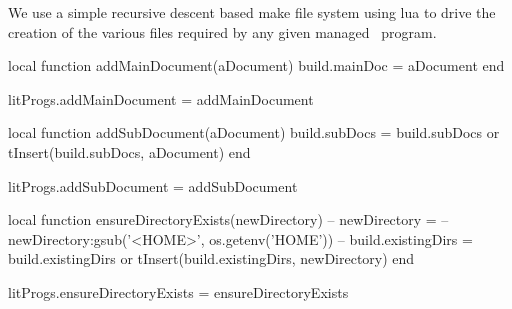 
\startchapter[title=Lua Make System Files]

We use a simple recursive descent based make file system using lua to 
drive the creation of the various files required by any given 
 managed \ConTeXt\ program. 

\startMkIVCode
\def\addMainDocument#1{
  \directlua{
    thirddata.literateProgs.addMainDocument('#1')
  }
}

\def\addSubDocument#1{
  \directlua{
    thirddata.literateProgs.addSubDocument('#1')
  }
}

\def\ensureDirectoryExists#1{
  \directlua{
    thirddata.literateProgs.ensureDirectoryExists('#1')
  }
}

\def\addDocumentDirectory#1{
  \directlua{
    thirddata.literateProgs.addDocumentDirectory('#1')
  }
}

\def\addConTeXtModuleFile#1{
  \directlua{
    thirddata.literateProgs.addConTeXtModuleFile('#1')
  }
}

\def\addConTeXtModuleDirectory#1{
  \directlua{
    thirddata.literateProgs.addConTeXtModuleDirectory('#1')
  }
}

\def\addCCodeProgram#1{
  \directlua{
    thirddata.literateProgs.addCCodeProgram('#1')
  }
}

\def\addCCodeLibDirectory#1{
  \directlua{
    thirddata.literateProgs.addCCodeLibDirectory('#1')
  }
}

\def\addCCodeLib#1{
  \directlua{
    thirddata.literateProgs.addCCodeLib('#1')
  }
}

\def\addCCodeTargets#1{
  \directlua{
    thirddata.literateProgs.addCCodeTargets('#1')
  }
}
\stopMkIVCode

\startLuaCode
local function addMainDocument(aDocument)
  build.mainDoc = aDocument
end

litProgs.addMainDocument = addMainDocument

local function addSubDocument(aDocument)
  build.subDocs = build.subDocs or { }
  tInsert(build.subDocs, aDocument)
end

litProgs.addSubDocument = addSubDocument

local function ensureDirectoryExists(newDirectory)
--  newDirectory =
--    newDirectory:gsub('<HOME>', os.getenv('HOME'))
--  build.existingDirs = build.existingDirs or { }
  tInsert(build.existingDirs, newDirectory)
end

litProgs.ensureDirectoryExists = ensureDirectoryExists

